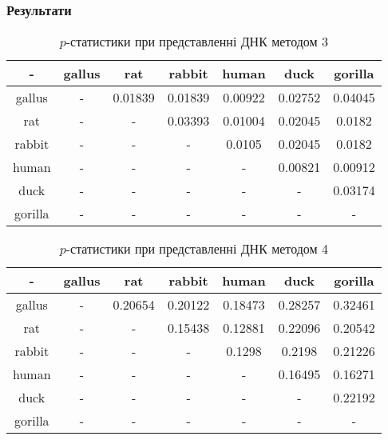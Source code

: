 \documentclass[mathserif,serif,10pt]{beamer}
\begin{document}
\begin{frame}
\frametitle{Результати}

\begin{table}[h!]
\begin{center}
\begin{tabular}{|c|c|c|c|c|c|c|}
\hline
- & gallus & rat & rabbit & human & duck & gorilla \\ \hline
gallus & - & 0.01839 & 0.01839 & 0.00922 & 0.02752 & 0.04045 \\ \hline
rat & - & - & 0.03393 & 0.01004 & 0.02045 & 0.0182 \\ \hline
rabbit & - & - & - & 0.0105 & 0.02045 & 0.0182 \\ \hline
human & - & - & - & - & 0.00821 & 0.00912 \\ \hline
duck & - & - & - & - & - & 0.03174 \\ \hline
gorilla & - & - & - & - & - & - \\ \hline
\end{tabular}
\end{center}
\caption{$p$-статистики при представленні ДНК методом 3}
\label{table:res3}
\end{table}

\begin{table}[h!]
\begin{center}
\begin{tabular}{|c|c|c|c|c|c|c|}
\hline
- & gallus & rat & rabbit & human & duck & gorilla \\ \hline
gallus & - & 0.20654 & 0.20122 & 0.18473 & 0.28257 & 0.32461 \\ \hline
rat & - & - & 0.15438 & 0.12881 & 0.22096 & 0.20542 \\ \hline
rabbit & - & - & - & 0.1298 & 0.2198 & 0.21226 \\ \hline
human & - & - & - & - & 0.16495 & 0.16271 \\ \hline
duck & - & - & - & - & - & 0.22192 \\ \hline
gorilla & - & - & - & - & - & - \\ \hline
\end{tabular}
\end{center}
\caption{$p$-статистики при представленні ДНК методом 4}
\label{table:res4}
\end{table}

\end{frame}
\end{document}
